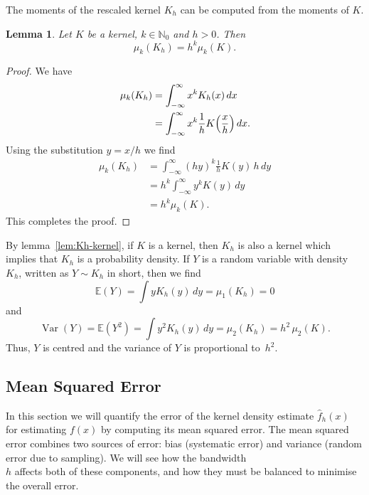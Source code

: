 \documentclass[
  a4paper,
]{article}
\newtheorem{lemma}{Lemma}[section]
\theoremstyle{definition}
\theoremstyle{definition}
\theoremstyle{definition}
\theoremstyle{definition}
\theoremstyle{remark}
\begin{document}
The moments of the rescaled kernel \(K_h\)
can be computed from the moments of \(K\).

\begin{lemma}
\protect\hypertarget{lem:Kh-scal}{}\label{lem:Kh-scal}Let \(K\) be a kernel, \(k \in \mathbb{N}_0\) and \(h > 0\). Then
\begin{equation*}
  \mu_k(K_h)
  = h^k \mu_k(K).
\end{equation*}
\end{lemma}

\begin{proof}
We have
\begin{align*}
  \mu_k(K_h)
  &= \int_{-\infty}^\infty x^k K_h(x) \,dx \\
  &= \int_{-\infty}^\infty x^k \frac1h K\Bigl(\frac{x}{h}\Bigr) \,dx.
\end{align*}
Using the substitution \(y = x/h\) we find
\begin{align*}
  \mu_k(K_h)
  &= \int_{-\infty}^\infty (hy)^k \frac1h K(y) \, h \,dy \\
  &= h^k \int_{-\infty}^\infty y^k K(y) \,dy \\
  &= h^k \mu_k(K).
\end{align*}
This completes the proof.
\end{proof}

By lemma~\ref{lem:Kh-kernel}, if \(K\) is a kernel, then \(K_h\) is also a kernel which
implies that \(K_h\) is a probability density. If \(Y\) is a random variable with
density \(K_h\), written as \(Y \sim K_h\) in short, then we find
\begin{equation*}
  \mathbb{E}(Y)
  = \int y K_h(y) \,dy
  = \mu_1(K_h)
  = 0
\end{equation*}
and
\begin{equation}
  \mathop{\mathrm{Var}}(Y)
  = \mathbb{E}(Y^2)
  = \int y^2 K_h(y) \,dy
  = \mu_2(K_h)
  = h^2 \, \mu_2(K).  \label{eq:Kh-var-Y}
\end{equation}
Thus, \(Y\) is centred and the variance of \(Y\) is proportional to~\(h^2\).

\subsection{Mean Squared Error}\label{X02-error-MSE}

In this section we will quantify the error of the kernel density estimate
\(\hat f_h(x)\) for estimating \(f(x)\) by computing its mean squared error.
The mean squared error combines two sources of error: bias (systematic error)
and variance (random error due to sampling). We will see how the bandwidth\\
\(h\) affects both of these components, and how they must be balanced to minimise
the overall error.
\end{document}
